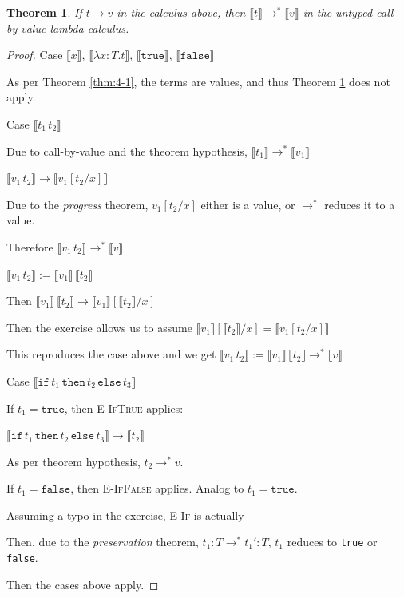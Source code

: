 \documentclass[13pt, a4paper]{article}
\newtheorem{theorem}{Theorem}
\begin{document}
\begin{theorem}\label{thm:4-2}
If $ t\to  v$ in the calculus above, then $\llbracket t\rrbracket \to^* \llbracket v\rrbracket$ in the untyped call-by-value lambda calculus.
\end{theorem}

\begin{proof}

Case $\llbracket x \rrbracket$, $\llbracket \lambda x:T.t \rrbracket$, $\llbracket \texttt{true} \rrbracket$, $\llbracket \texttt{false} \rrbracket$

As per Theorem \ref{thm:4-1}, the terms are values, and thus Theorem \ref{thm:4-2} does not apply.

\noindent Case $\llbracket t_1\,t_2 \rrbracket$

Due to call-by-value and the theorem hypothesis, $\llbracket t_1 \rrbracket \to^* \llbracket v_1 \rrbracket$

$\llbracket v_1\,t_2 \rrbracket \to \llbracket v_1[t_2/x] \rrbracket$

Due to the \textit{progress} theorem, $v_1[t_2/x]$ either is a value, or $\to^*$ reduces it to a value.

Therefore $\llbracket v_1\,t_2 \rrbracket \to^* \llbracket v \rrbracket$

$\llbracket v_1\,t_2 \rrbracket := \llbracket v_1 \rrbracket\,\llbracket t_2 \rrbracket$

Then $\llbracket v_1 \rrbracket\,\llbracket t_2 \rrbracket \to \llbracket v_1 \rrbracket[\llbracket t_2 \rrbracket/x]$

Then the exercise allows us to assume $\llbracket v_1 \rrbracket[\llbracket t_2 \rrbracket/x] = \llbracket v_1 [t_2 /x]\rrbracket$

This reproduces the case above and we get $\llbracket v_1\,t_2 \rrbracket := \llbracket v_1 \rrbracket\,\llbracket t_2 \rrbracket \to^* \llbracket v \rrbracket$

\noindent Case $\llbracket \texttt{if}\,t_1\,\texttt{then}\,t_2\,\texttt{else}\,t_3 \rrbracket$

If $t_1 = \texttt{true}$, then \textsc{E-IfTrue} applies:

$\llbracket \texttt{if}\,t_1\,\texttt{then}\,t_2\,\texttt{else}\,t_3 \rrbracket\to \llbracket t_2 \rrbracket$

As per theorem hypothesis, $t_2 \to^* v$.

If $t_1 = \texttt{false}$, then \textsc{E-IfFalse} applies. Analog to $t_1 = \texttt{true}$.

Assuming a typo in the exercise, \textsc{E-If} is actually

\begin{prooftree}
\end{prooftree}

Then, due to the \textit{preservation} theorem, $t_1 : T \to^* t_1' : T$, $t_1$ reduces to \texttt{true} or \texttt{false}.

Then the cases above apply.

\end{proof}
\end{document}
